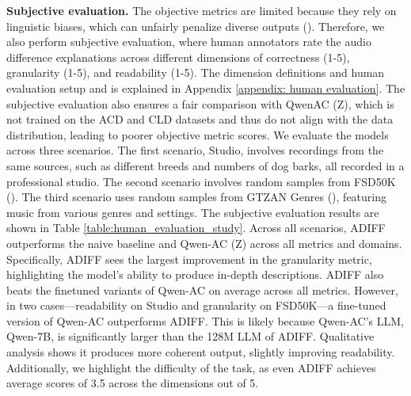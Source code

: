 \textbf{Subjective evaluation.} The objective metrics are limited because they rely on linguistic biases, which can unfairly penalize diverse outputs (\cite{morato2021diversity,mei2024towards}). Therefore, we also perform subjective evaluation, where human annotators rate the audio difference explanations across different dimensions of correctness (1-5), granularity (1-5), and readability (1-5). The dimension definitions and human evaluation setup and is explained in Appendix \ref{appendix: human evaluation}. The subjective evaluation also ensures a fair comparison with QwenAC (Z), which is not trained on the ACD and CLD datasets and thus do not align with the data distribution, leading to poorer objective metric scores. We evaluate the models across three scenarios. The first scenario, Studio, involves recordings from the same sources, such as different breeds and numbers of dog barks, all recorded in a professional studio. The second scenario involves random samples from FSD50K (\cite{fsd50k}). The third scenario uses random samples from GTZAN Genres (\cite{gtzan}), featuring music from various genres and settings. The subjective evaluation results are shown in Table \ref{table:human_evaluation_study}. Across all scenarios, ADIFF outperforms the naive baseline and Qwen-AC (Z) across all metrics and domains.  Specifically, ADIFF sees the largest improvement in the granularity metric, highlighting the model's ability to produce in-depth descriptions. ADIFF also beats the finetuned variants of Qwen-AC on average across all metrics. However, in two cases—readability on Studio and granularity on FSD50K—a fine-tuned version of Qwen-AC outperforms ADIFF. This is likely because Qwen-AC's LLM, Qwen-7B, is significantly larger than the 128M LLM of ADIFF. Qualitative analysis shows it produces more coherent output, slightly improving readability. Additionally, we highlight the difficulty of the task, as even ADIFF achieves average scores of 3.5 across the dimensions out of 5.

